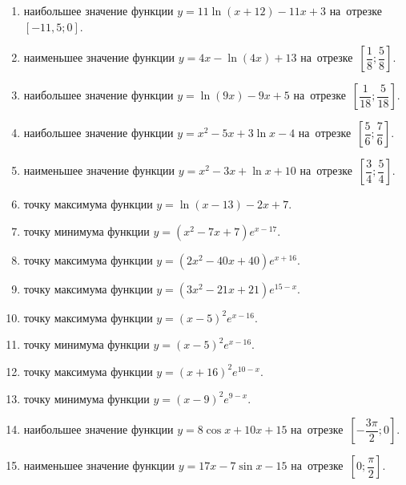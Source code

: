 \documentclass[a4paper,10pt]{article}
\begin{document}
\begin{enumerate}
\item {} наибольшее значение функции $y = 11\ln \left(x+12\right)-11x +3$ на~отрезке~$\left[-11,5;0\right]$.

\item {} наименьшее значение функции $y = 4x-\ln \left(4x\right)+13$ на~отрезке~$\left[\dfrac{1}{8};\dfrac{5}{8}\right]$.

\item {} наибольшее значение функции $y = \ln \left(9x\right)-9x+5$ на~отрезке~$\left[\dfrac{1}{18};\dfrac{5}{18}\right]$.

\item {} наибольшее значение функции $y=x^2-5x+3\ln x-4$ на~отрезке~$\left[\dfrac{5}{6};\dfrac{7}{6}\right]$.

\item {} наименьшее значение функции $y=x^2-3x+\ln x+10$ на~отрезке~$\left[\dfrac{3}{4};\dfrac{5}{4}\right]$.

\item {} точку максимума функции $y=\ln \left(x-13\right)-2x+7$.

\item {} точку минимума функции $y=\left(x^2-7x+7\right)e^{x-17}$.

\item {} точку максимума функции $y=\left(2x^2-40x+40\right)e^{x+16}$.

\item {} точку максимума функции $y=\left(3x^2-21x+21\right)e^{15-x}$.

\item {} точку максимума функции $y=\left(x -5\right)^2e^{x-16}$.

\item {} точку минимума функции $y=\left(x -5\right)^2e^{x-16}$.

\item {} точку максимума функции $y=\left(x +16\right)^2e^{10-x}$.

\item {} точку минимума функции $y=\left(x -9\right)^2e^{9-x}$.

\item {} наибольшее значение функции $y=8\cos x+10x +15$ на~отрезке~$\left[-\dfrac{3\pi }{2};0\right]$.

\item {} наименьшее значение функции $y=17x-7\sin x -15$ на~отрезке~$\left[0;\dfrac{\pi }{2}\right]$.


\end{enumerate}
\end{document}
